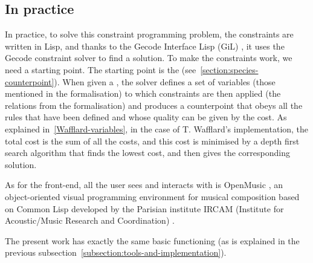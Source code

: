  \subsection{In practice}
 In practice, to solve this constraint programming problem, the constraints are written in Lisp, and thanks to the Gecode Interface Lisp (GiL) \cite{GiL}, it uses the Gecode constraint solver \cite{Gecode} to find a solution. To make the constraints work, we need a starting point. The starting point is the \cf (see~\ref{section:species-counterpoint}).
 When given a \cf, the solver defines a set of variables (those mentioned in the formalisation) to which constraints are then applied (the relations from the formalisation) and produces a counterpoint that obeys all the rules that have been defined and whose quality can be given by the cost. As explained in~\ref{Wafflard-variables}, in the case of T. Wafflard's implementation, the total cost is the sum of all the costs, and this cost is minimised by a depth first search algorithm that finds the lowest cost, and then gives the corresponding solution.
 
 
 As for the front-end, all the user sees and interacts with is OpenMusic \cite{OpenMusic}, an object-oriented visual programming environment for musical composition based on Common Lisp \cite{commonlisp} developed by the Parisian institute IRCAM (Institute for Acoustic/Music Research and Coordination) \cite{IRCAM}.
 
 The present work has exactly the same basic functioning (as is explained in the previous subsection~\ref{subsection:tools-and-implementation}). 


